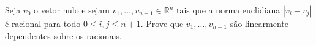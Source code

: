 Seja \(v_{0}\) o vetor nulo e sejam \(v_{1},\dots,v_{n+1}\in\mathbb{R}^{n}\) tais que a norma euclidiana \(|v_{i}-v_{j}|\) é racional para todo \(0\le i,j\le n+1\). Prove que \(v_{1},\dots,v_{n+1}\) são linearmente dependentes sobre os racionais.
